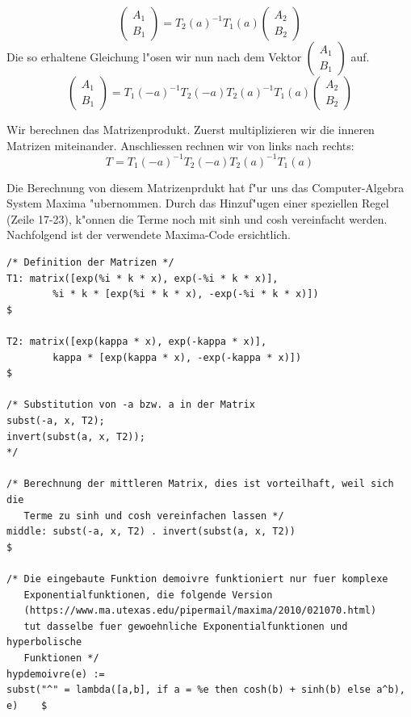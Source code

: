 \begin{refsection}
\[\begin{pmatrix}
A_1
\\
B_1
\end{pmatrix}
=
T_2(a)^{-1}T_1(a)
\begin{pmatrix}
A_2
\\
B_2
\end{pmatrix}
\]
Die so erhaltene Gleichung l"osen wir nun nach dem Vektor
$
\begin{pmatrix}
A_1
\\
B_1
\end{pmatrix}
$
auf.
\[
\begin{pmatrix}
A_1
\\
B_1
\end{pmatrix}
=
T_1(-a)^{-1}T_2(-a)T_2(a)^{-1}T_1(a)
\begin{pmatrix}
A_2
\\
B_2
\end{pmatrix}
\]

Wir berechnen das Matrizenprodukt. 
Zuerst multiplizieren wir die inneren Matrizen miteinander. 
Anschliessen rechnen wir von links nach rechts:
\[
T = T_1(-a)^{-1}T_2(-a)T_2(a)^{-1}T_1(a)
\]

Die Berechnung von diesem Matrizenprdukt hat f"ur uns das Computer-Algebra System Maxima "ubernommen. 
Durch das Hinzuf"ugen einer speziellen Regel (Zeile 17-23), k"onnen die Terme noch mit sinh und cosh vereinfacht werden.
Nachfolgend ist der verwendete Maxima-Code ersichtlich.

\begin{lstlisting}[style=Maxima]
/* Definition der Matrizen */
T1: matrix([exp(%i * k * x), exp(-%i * k * x)],
        %i * k * [exp(%i * k * x), -exp(-%i * k * x)])                      $

T2: matrix([exp(kappa * x), exp(-kappa * x)],
        kappa * [exp(kappa * x), -exp(-kappa * x)])                         $

/* Substitution von -a bzw. a in der Matrix
subst(-a, x, T2);
invert(subst(a, x, T2));
*/

/* Berechnung der mittleren Matrix, dies ist vorteilhaft, weil sich die
   Terme zu sinh und cosh vereinfachen lassen */
middle: subst(-a, x, T2) . invert(subst(a, x, T2))                          $

/* Die eingebaute Funktion demoivre funktioniert nur fuer komplexe
   Exponentialfunktionen, die folgende Version
   (https://www.ma.utexas.edu/pipermail/maxima/2010/021070.html)
   tut dasselbe fuer gewoehnliche Exponentialfunktionen und hyperbolische
   Funktionen */
hypdemoivre(e) :=
subst("^" = lambda([a,b], if a = %e then cosh(b) + sinh(b) else a^b), e)    $


\end{lstlisting}
\end{refsection}
